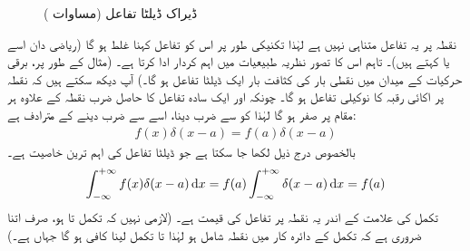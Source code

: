 \begin{figure}
\centering
{}
\caption{ڈیراک ڈیلٹا تفاعل (مساوات )}
\label{شکل_غیر_تابع_ڈیراک_ڈیلٹا_تفاعل}
\end{figure}

نقطہ  پر یہ تفاعل متناہی نہیں ہے لہٰذا تکنیکی طور پر اس کو تفاعل کہنا غلط ہو گا (ریاضی دان اسے  یا  کہتے ہیں)۔ تاہم اس کا تصور نظریہ طبیعیات میں اہم کردار ادا کرتا ہے۔ (مثال کے طور پر، برقی حرکیات کے میدان میں نقطی بار کی کثافت بار ایک ڈیلٹا تفاعل ہو گا۔) آپ دیکھ سکتے ہیں کہ  نقطہ  پر اکائی رقبہ کا نوکیلی تفاعل ہو گا۔ چونکہ  اور ایک سادہ تفاعل  کا حاصل ضرب نقطہ  کے علاوہ ہر مقام پر صفر ہو گا لہٰذا  کو  سے ضرب دینا، اسے  سے ضرب دینے کے مترادف ہے:
\begin{align}
f(x)\delta(x-a)=f(a)\delta(x-a)
\end{align}
بالخصوص درج ذیل لکھا جا سکتا ہے جو ڈیلٹا تفاعل کی اہم ترین خاصیت ہے۔ 
\begin{align}\label{مساوات_شروڈنگر_ڈیلٹا_تفاعل_اٹھاتا_ہے}
\int_{-\infty}^{+\infty}f(x)\delta(x-a)\dif{x}=f(a)\int_{-\infty}^{+\infty}\delta(x-a)\dif{x}=f(a)
\end{align}
 تکمل کی علامت کے اندر یہ نقطہ  پر تفاعل  کی قیمت  ہے۔ (لازمی نہیں کہ تکمل  تا  ہو، صرف اتنا ضروری ہے کہ تکمل کے دائرہ کار میں نقطہ  شامل ہو لہٰذا  تا  تکمل لینا کافی ہو گا جہاں  ہے۔) 

